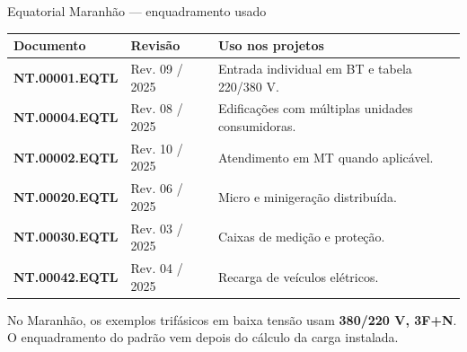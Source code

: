 \begin{frame}[shrink=6]{Equatorial Maranhão — enquadramento usado}
\scriptsize
\begin{tabularx}{\textwidth}{>{\bfseries}p{2.7cm}p{2.0cm}X}
\toprule
Documento & Revisão & Uso nos projetos \\
\midrule
NT.00001.EQTL & Rev. 09 / 2025 & Entrada individual em BT e tabela 220/380 V. \\
NT.00004.EQTL & Rev. 08 / 2025 & Edificações com múltiplas unidades consumidoras. \\
NT.00002.EQTL & Rev. 10 / 2025 & Atendimento em MT quando aplicável. \\
NT.00020.EQTL & Rev. 06 / 2025 & Micro e minigeração distribuída. \\
NT.00030.EQTL & Rev. 03 / 2025 & Caixas de medição e proteção. \\
NT.00042.EQTL & Rev. 04 / 2025 & Recarga de veículos elétricos. \\
\bottomrule
\end{tabularx}
\vspace{1mm}
\begin{caixaNorma}
No Maranhão, os exemplos trifásicos em baixa tensão usam \textbf{380/220 V, 3F+N}. O enquadramento do padrão vem depois do cálculo da carga instalada.
\end{caixaNorma}
\end{frame}

